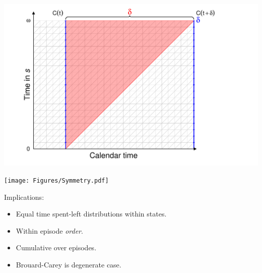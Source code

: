\documentclass[20pt,usenames,dvipsnames]{beamer}
\begin{document}
\begin{frame}[plain]
\Large
\begin{center}
\includegraphics[]{Figures/Proof25.pdf}
\end{center}
\end{frame}

\begin{frame}[plain]
\Large
\begin{center}
\texttt{[image: Figures/Symmetry.pdf]}
\end{center}
\end{frame}


\begin{frame}[plain]
\Large
\begin{center}
Implications:
\pause
\begin{itemize}[<+->]
  \item Equal time spent-left distributions within states.
  \item Within episode \emph{order}. 
  \item Cumulative over episodes.
  \item Brouard-Carey is degenerate case.
\end{itemize}
\end{center}
\end{frame}

%
\end{document}
